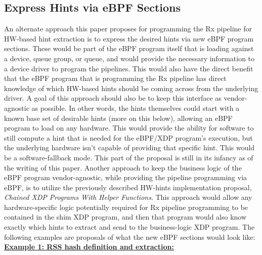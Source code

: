 \documentclass[letterpaper]{article}
\begin{document}
\subsection{Express Hints via eBPF Sections}

An alternate approach this paper proposes for programming the Rx pipeline for HW-based hint extraction is to express the desired hints via new eBPF program sections. These would be part of the eBPF program itself that is loading against a device, queue group, or queue, and would provide the necessary information to a device driver to program the pipelines. This would also have the direct benefit that the eBPF program that is programming the Rx pipeline has direct knowledge of which HW-based hints should be coming across from the underlying driver.
\newline
\indent A goal of this approach should also be to keep this interface as vendor-agnostic as possible. In other words, the hints themselves could start with a known base set of desirable hints (more on this below), allowing an eBPF program to load on any hardware. This would provide the ability for software to still compute a hint that is needed for the eBPF/XDP program's execution, but the underlying hardware isn't capable of providing that specific hint. This would be a software-fallback mode. This part of the proposal is still in its infancy as of the writing of this paper.
\newline
\indent Another approach to keep the business logic of the eBPF program vendor-agnostic, while providing the pipeline programming via eBPF, is to utilize the previously described HW-hints implementation proposal, \textit{Chained XDP Programs With Helper Functions}. This approach would allow any hardware-specific logic potentially required for Rx pipeline programming to be contained in the shim XDP program, and then that program would also know exactly which hints to extract and send to the business-logic XDP program.
\newline
\newline
The following examples are proposals of what the new eBPF sections would look like:
\newline
\newline
\textbf{\underline{Example 1: RSS hash definition and extraction:}}
\newline
\newline
\end{document}
